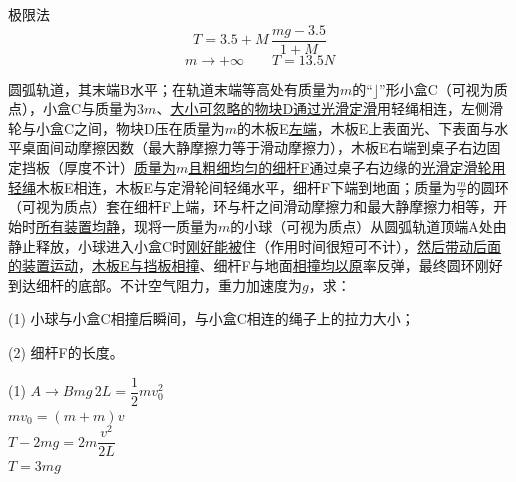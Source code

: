 极限法
\[
T=3.5+M\,\frac{mg-3.5}{1+M}
\]%
\[
m\to+\infty\qquad T=13.5\unit{N}
\]
\begin{problem}
圆弧轨道，其末端B水平；在轨道末端等高处有质量为$m$的“$\rfloor$”形小盒C（可视为质点），小盒C与质量为$3m$、\underline{大小可忽略的物块D通过光滑定滑}用轻绳相连，左侧滑轮与小盒C之间，物块D压在质量为\underline{$m$}的木板E\underline{左端}，木板E上表面光、下表面与水平桌面间动摩擦因数（最大静摩擦力等于滑动摩擦力），木板E右端到桌子右边固定挡板（厚度不计）\underline{质量为$m$且粗细均匀的细杆F}通过桌子右边缘的\underline{光滑定滑轮用轻绳}木板E相连，木板E与定滑轮间轻绳水平，细杆F下端到地面；质量为$\frac m2$的圆环（可视为质点）套在细杆F上端，环与杆之间滑动摩擦力和最大静摩擦力相等，开始时\underline{所有装置均静}，现将一质量为$m$的小球（可视为质点）从圆弧轨道顶端A处由静止释放，小球进入小盒C时\underline{刚好能被}住（作用时间很短可不计），\underline{然后带动后面的装置运动}，\underline{木板E与挡板相撞}、细杆F与地面\underline{相撞均以原}率反弹，最终圆环刚好到达细杆的底部。不计空气阻力，重力加速度为$g$，求：

(1) 小球与小盒C相撞后瞬间，与小盒C相连的绳子上的拉力大小；

(2) 细杆F的长度。


\begin{solution}
(1) $A\to B$\quad $mg\,2L=\dfrac12 mv_0^2$\\
\hspace*{3em}$mv_0=(m+m)v$\\
\hspace*{3em}$T-2mg=2m\dfrac{v^2}{2L}$\\
\hspace*{3em}$T=3mg$


\end{solution}
\end{problem}
